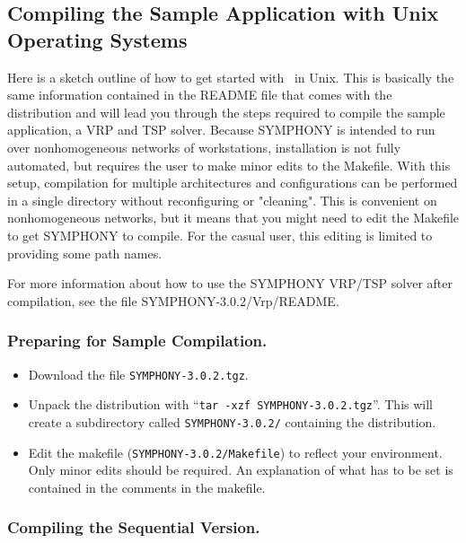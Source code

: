 
\subsection{Compiling the Sample Application with Unix Operating Systems}
\label{getting_strated_unix}

Here is a sketch outline of how to get started with \BB\ in Unix. This is
basically the same information contained in the README file that comes with
the distribution and will lead you through the steps required to compile the
sample application, a VRP and TSP solver. Because SYMPHONY is intended to run
over nonhomogeneous networks of workstations, installation is not fully
automated, but requires the user to make minor edits to the Makefile.  With
this setup, compilation for multiple architectures and configurations can be
performed in a single directory without reconfiguring or "cleaning". This is
convenient on nonhomogeneous networks, but it means that you might need to
edit the Makefile to get SYMPHONY to compile. For the casual user, this
editing is limited to providing some path names.

For more information about how to use the SYMPHONY VRP/TSP solver after
compilation, see the file SYMPHONY-3.0.2/Vrp/README.

\subsubsection{Preparing for Sample Compilation.}

\begin{itemize}

        \item Download the file {\tt SYMPHONY-3.0.2.tgz}.

        \item Unpack the distribution with ``{\tt tar -xzf
        SYMPHONY-3.0.2.tgz}''. This will create a subdirectory called
        {\tt SYMPHONY-3.0.2/} containing the distribution.
        
        \item Edit the makefile ({\tt SYMPHONY-3.0.2/Makefile}) to reflect your
	environment. Only minor edits should be required. An explanation of
	what has to be set is contained in the comments in the makefile.

\end{itemize}
        
\subsubsection{Compiling the Sequential Version.}


